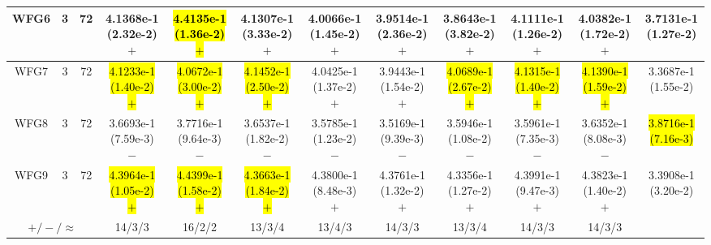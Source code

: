 \documentclass[journal]{IEEEtran}
\begin{document}
\begin{table*}[htbp]
\begin{tabular}{cccccccccccc}
\hline
\multirow{1}{*}{WFG6}&3&72&4.1368e-1 (2.32e-2) $+$&\hl{4.4135e-1 (1.36e-2) $+$}&4.1307e-1 (3.33e-2) $+$&4.0066e-1 (1.45e-2) $+$&3.9514e-1 (2.36e-2) $+$&3.8643e-1 (3.82e-2) $+$&4.1111e-1 (1.26e-2) $+$&4.0382e-1 (1.72e-2) $+$&3.7131e-1 (1.27e-2)\\
\hline
\multirow{1}{*}{WFG7}&3&72&\hl{4.1233e-1 (1.40e-2) $+$}&\hl{4.0672e-1 (3.00e-2) $+$}&\hl{4.1452e-1 (2.50e-2) $+$}&4.0425e-1 (1.37e-2) $+$&3.9443e-1 (1.54e-2) $+$&\hl{4.0689e-1 (2.67e-2) $+$}&\hl{4.1315e-1 (1.40e-2) $+$}&\hl{4.1390e-1 (1.59e-2) $+$}&3.3687e-1 (1.55e-2)\\
\hline
\multirow{1}{*}{WFG8}&3&72&3.6693e-1 (7.59e-3) $-$&3.7716e-1 (9.64e-3) $-$&3.6537e-1 (1.82e-2) $-$&3.5785e-1 (1.23e-2) $-$&3.5169e-1 (9.39e-3) $-$&3.5946e-1 (1.08e-2) $-$&3.5961e-1 (7.35e-3) $-$&3.6352e-1 (8.08e-3) $-$&\hl{3.8716e-1 (7.16e-3)}\\
\hline
\multirow{1}{*}{WFG9}&3&72&\hl{4.3964e-1 (1.05e-2) $+$}&\hl{4.4399e-1 (1.58e-2) $+$}&\hl{4.3663e-1 (1.84e-2) $+$}&4.3800e-1 (8.48e-3) $+$&4.3761e-1 (1.32e-2) $+$&4.3356e-1 (1.27e-2) $+$&4.3991e-1 (9.47e-3) $+$&4.3823e-1 (1.40e-2) $+$&3.3908e-1 (3.20e-2)\\
\hline
\multicolumn{3}{c}{$+/-/\approx$}&14/3/3&16/2/2&13/3/4&13/4/3&14/3/3&13/3/4&14/3/3&14/3/3&\\
\bottomrule
\end{tabular}
\label{No Label}
\end{table*}
\end{document}

